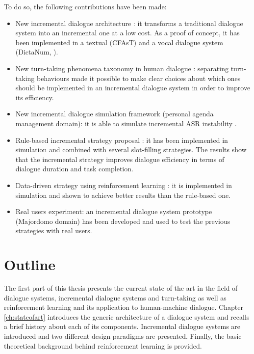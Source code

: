 				To do so, the following contributions have been made:
				
				\begin{itemize}
					\item New incremental dialogue architecture : it transforms a traditional dialogue system into an incremental one at a low cost. As a proof of concept, it has been implemented in a textual (CFAsT) and a vocal dialogue system (DictaNum, ).
					\item New turn-taking phenomena taxonomy in human dialogue : separating turn-taking behaviours made it possible to make clear choices about which ones should be implemented in an incremental dialogue system in order to improve its efficiency.
					\item New incremental dialogue simulation framework (personal agenda management domain): it is able to simulate incremental ASR instability .
					\item Rule-based incremental strategy proposal : it has been implemented in simulation and combined with several slot-filling strategies. The results show that the incremental strategy improves dialogue efficiency in terms of dialogue duration and task completion.
					\item Data-driven strategy using reinforcement learning : it is implemented in simulation and shown to achieve better results than the rule-based one.
					\item Real users experiment: an incremental dialogue system prototype (Majordomo domain) has been developed and used to test the previous strategies with real users.
				\end{itemize}
				
\section*{Outline}

				The first part of this thesis presents the current state of the art in the field of dialogue systems, incremental dialogue systems and turn-taking as well as reinforcement learning and its application to human-machine dialogue. Chapter \ref{ch:stateofart} introduces the generic architecture of a dialogue system and recalls a brief history about each of its components. Incremental dialogue systems are introduced and two different design paradigms are presented. Finally, the basic theoretical background behind reinforcement learning is provided.
				
